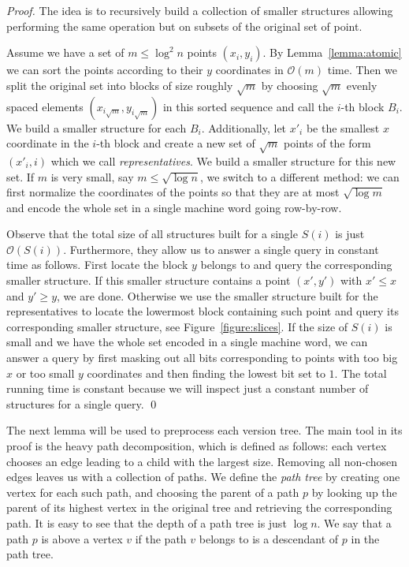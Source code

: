 \documentclass[runningheads]{llncs}
\begin{document}
\begin{proof}
The idea is to recursively build a collection of smaller structures allowing performing the same operation but on subsets of the original set of point. 

Assume we have a set of $m \leq \log^2 n$ points $(x_i,y_i)$. By Lemma~\ref{lemma:atomic} we can sort the points according to their $y$ coordinates in $\mathcal{O}(m)$ time. Then we split the original set into blocks of size roughly $\sqrt{m}$ by choosing $\sqrt{m}$ evenly spaced elements $(x_{i\sqrt{m}},y_{i\sqrt{m}})$ in this sorted sequence and call the $i$-th block $B_i$. We build a smaller structure for each $B_i$. Additionally, let $x'_i$ be the smallest $x$ coordinate in the $i$-th block and create a new set of $\sqrt{m}$ points of the form $(x'_i,i)$ which we call \emph{representatives}. We build a smaller structure for this new set. If $m$ is very small, say $m\leq\sqrt{\log n}$, we switch to a different method: we can first normalize the coordinates of the points so that they are at most $\sqrt{\log m}$ and encode the whole set in a single machine word going row-by-row.

Observe that the total size of all structures built for a single $S(i)$ is just $\mathcal{O}(S(i))$. Furthermore, they allow us to answer a single query in constant time as follows. First locate the block $y$ belongs to and query the corresponding smaller structure. If this smaller structure contains a point $(x',y')$ with $x'\leq x$ and $y'\geq y$, we are done. Otherwise we use the smaller structure built for the representatives to locate the lowermost block containing such point and query its corresponding smaller structure, see Figure~\ref{figure:slices}. If the size of $S(i)$ is small and we have the whole set encoded in a single machine word, we can answer a query by first masking out all bits corresponding to points with too big $x$ or too small $y$ coordinates and then finding the lowest bit set to $1$. The total running time is constant because we will inspect just a constant number of structures for a single query.
\qed
\end{proof}

The next lemma will be used to preprocess each version tree. The main tool in its proof is the heavy path decomposition, which is defined as follows: each vertex chooses an edge leading to a child with the largest size. Removing all non-chosen edges leaves us with a collection of paths. We define the \emph{path tree} by creating one vertex for each such path, and choosing the parent of a path $p$ by looking up the parent of its highest vertex in the original tree and retrieving the corresponding path. It is easy to see that the depth of a path tree is just $\log n$. We say that a path $p$ is above a vertex $v$ if the path $v$ belongs to is a descendant of $p$ in the path tree. 
\end{document}
